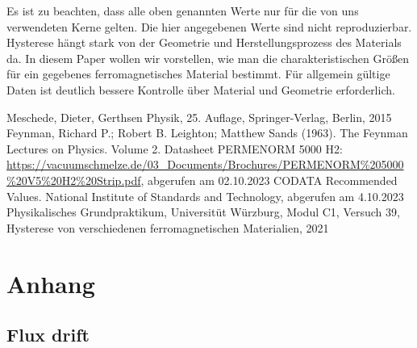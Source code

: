 \documentclass[a4paper,10pt,twocolumn]{article}
\begin{document}
    Es ist zu beachten, dass alle oben genannten Werte nur für die von uns verwendeten Kerne gelten.
    Die hier angegebenen Werte sind nicht reproduzierbar.
    Hysterese hängt stark von der Geometrie und Herstellungsprozess des Materials da.
    In diesem Paper wollen wir vorstellen, wie man die charakteristischen Größen für ein gegebenes
    ferromagnetisches Material bestimmt.
    Für allgemein gültige Daten ist deutlich bessere Kontrolle über Material und Geometrie erforderlich.
    
    
    \begin{thebibliography}{}    %
         Meschede, Dieter, Gerthsen Physik, 25. Auflage, Springer-Verlag, Berlin, 2015
          Feynman, Richard P.; Robert B. Leighton; Matthew Sands (1963).
        The Feynman Lectures on Physics. Volume 2.
         Datasheet PERMENORM 5000 H2: \url{https://vacuumschmelze.de/03_Documents/Brochures/PERMENORM%205000%20V5%20H2%20Strip.pdf},
        abgerufen am 02.10.2023
         CODATA Recommended Values. National Institute of Standards and Technology, abgerufen am 4.10.2023
         Physikalisches Grundpraktikum, Universitüt Würzburg, Modul C1, Versuch 39, Hysterese von verschiedenen ferromagnetischen Materialien, 2021
    \end{thebibliography}
    
    
    \section{Anhang}

    \subsection{Flux drift}
    \label{subsec:fluxDrift}

    
\end{document}
